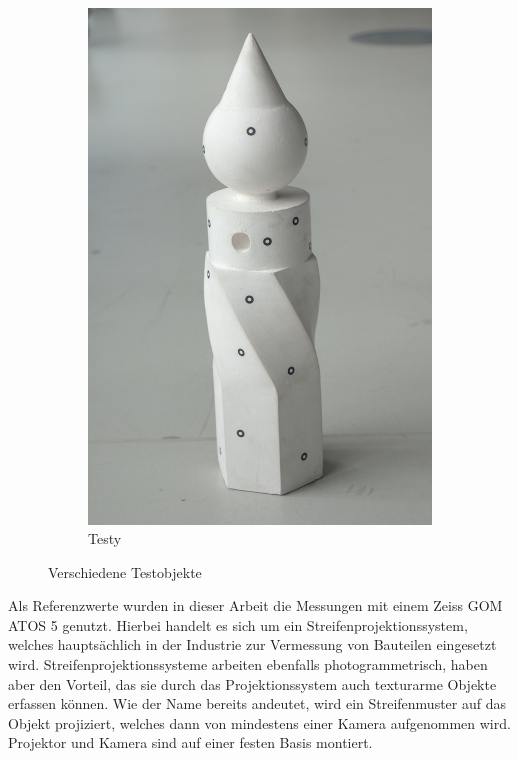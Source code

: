 \documentclass[./00PhotoBox.tex]{subfiles}
\begin{document}
\begin{figure}[htbp]
\begin{subfigure}{0.32\textwidth}
        \includegraphics[width=1\textwidth]{img/7_versuche/bild_testy.jpg}
        \caption{Testy}
        \label{img:bild_testy}
    \end{subfigure}
    \caption{Verschiedene Testobjekte}
    \label{img:bilder_testobjekte}
\end{figure}

Als Referenzwerte wurden in dieser Arbeit die Messungen mit einem Zeiss GOM ATOS 5 genutzt. Hierbei handelt es sich um ein Streifenprojektionssystem, welches hauptsächlich in der Industrie zur Vermessung von Bauteilen eingesetzt wird. Streifenprojektionssysteme arbeiten ebenfalls photogrammetrisch, haben aber den Vorteil, das sie durch das Projektionssystem auch texturarme Objekte erfassen können. Wie der Name bereits andeutet, wird ein Streifenmuster auf das Objekt projiziert, welches dann von mindestens einer Kamera aufgenommen wird. Projektor und Kamera sind auf einer festen Basis montiert. \citep[vgl.][S. 581f]{luhmann}
\end{document}

